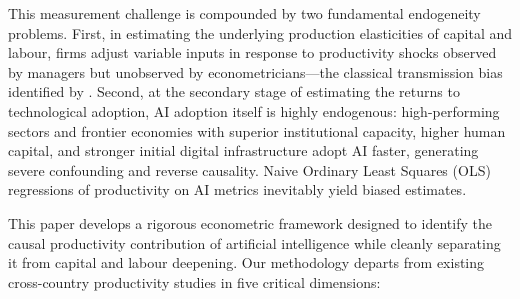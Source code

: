 \documentclass[11pt,a4paper]{article}
\begin{document}
This measurement challenge is compounded by two fundamental endogeneity problems. First, in estimating the underlying production elasticities of capital and labour, firms adjust variable inputs in response to productivity shocks observed by managers but unobserved by econometricians---the classical transmission bias identified by \citet{marschak1944}. Second, at the secondary stage of estimating the returns to technological adoption, AI adoption itself is highly endogenous: high-performing sectors and frontier economies with superior institutional capacity, higher human capital, and stronger initial digital infrastructure adopt AI faster, generating severe confounding and reverse causality. Naive Ordinary Least Squares (OLS) regressions of productivity on AI metrics inevitably yield biased estimates.

This paper develops a rigorous econometric framework designed to identify the causal productivity contribution of artificial intelligence while cleanly separating it from capital and labour deepening. Our methodology departs from existing cross-country productivity studies in five critical dimensions:
\end{document}
